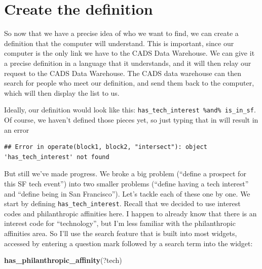 \documentclass[]{book}
\newenvironment{Shaded}{\begin{snugshade}}{\end{snugshade}}
\newcommand{\KeywordTok}[1]{\textcolor[rgb]{0.13,0.29,0.53}{\textbf{#1}}}
\newcommand{\NormalTok}[1]{#1}
\newcommand{\OperatorTok}[1]{\textcolor[rgb]{0.81,0.36,0.00}{\textbf{#1}}}
\newcommand{\StringTok}[1]{\textcolor[rgb]{0.31,0.60,0.02}{#1}}
\begin{document}
\hypertarget{intro-example-create-def}{%
\section{Create the definition}\label{intro-example-create-def}}

So now that we have a precise idea of who we want to find, we can create a definition that the computer will understand. This is important, since our computer is the only link we have to the CADS Data Warehouse. We can give it a precise definition in a language that it understands, and it will then relay our request to the CADS Data Warehouse. The CADS data warehouse can then search for people who meet our definition, and send them back to the computer, which will then display the list to us.

Ideally, our definition would look like this: \texttt{has\_tech\_interest\ \%and\%\ is\_in\_sf}. Of course, we haven't defined those pieces yet, so just typing that in will result in an error

\begin{Shaded}
\end{Shaded}

\begin{verbatim}
## Error in operate(block1, block2, "intersect"): object 'has_tech_interest' not found
\end{verbatim}

But still we've made progress. We broke a big problem (``define a prospect for this SF tech event'') into two smaller problems (``define having a tech interest'' and ``define being in San Francisco''). Let's tackle each of these one by one. We start by defining \texttt{has\_tech\_interest}. Recall that we decided to use interest codes and philanthropic affinities here. I happen to already know that there is an interest code for ``technology'', but I'm less familiar with the philanthropic affinities area. So I'll use the search feature that is built into most widgets, accessed by entering a question mark followed by a search term into the widget:

\begin{Shaded}
\begin{Highlighting}[]
\KeywordTok{has_philanthropic_affinity}\NormalTok{(?tech)}
\end{Highlighting}
\end{Shaded}
\end{document}
